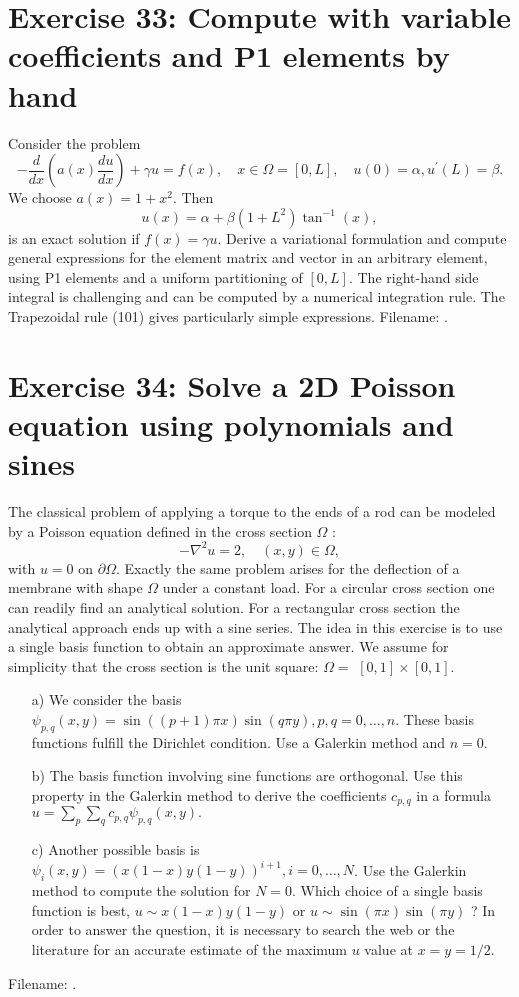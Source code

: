 \documentclass[../main.tex]{subfiles}
\begin{document}
	\section*{Exercise 33: Compute with variable coefficients and P1 elements by hand}
		\noindent Consider the problem
		\begin{equation}
			\label{311}
			-\frac{d}{d x}\left(a(x) \frac{d u}{d x}\right)+\gamma u=f(x), \quad x \in \Omega=[0, L], \quad u(0)=\alpha, u^{\prime}(L)=\beta .
		\end{equation}
		We choose $a(x)=1+x^{2}$. Then
		\begin{equation}
			\label{312}
			u(x)=\alpha+\beta\left(1+L^{2}\right) \tan ^{-1}(x),
		\end{equation}
		is an exact solution if $f(x)=\gamma u$.\smallbreak
		Derive a variational formulation and compute general expressions for the element matrix and vector in an arbitrary element, using P1 elements and a uniform partitioning of $[0, L]$. The right-hand side integral is challenging and can be computed by a numerical integration rule. The Trapezoidal rule (101) gives particularly simple expressions. Filename: .\bigbreak
	\section*{Exercise 34: Solve a 2D Poisson equation using polynomials and sines}
		\noindent The classical problem of applying a torque to the ends of a rod can be modeled by a Poisson equation defined in the cross section $\Omega$ :
		$$
		-\nabla^{2} u=2, \quad(x, y) \in \Omega,
		$$
		with $u=0$ on $\partial \Omega$. Exactly the same problem arises for the deflection of a membrane with shape $\Omega$ under a constant load.\smallbreak
		For a circular cross section one can readily find an analytical solution. For a rectangular cross section the analytical approach ends up with a sine series. The idea in this exercise is to use a single basis function to obtain an approximate answer.\smallbreak
		We assume for simplicity that the cross section is the unit square: $\Omega=$ $[0,1] \times[0,1]$.
		\begin{enumerate}
			\item[a)] We consider the basis $\psi_{p, q}(x, y)=\sin ((p+1) \pi x) \sin (q \pi y), p, q=0, \ldots, n$. These basis functions fulfill the Dirichlet condition. Use a Galerkin method and $n=0$.
			\item[b)] The basis function involving sine functions are orthogonal. Use this property in the Galerkin method to derive the coefficients $c_{p, q}$ in a formula $u=\sum_{p} \sum_{q} c_{p, q} \psi_{p, q}(x, y) .$
			\item [c)] Another possible basis is $\psi_{i}(x, y)=(x(1-x) y(1-y))^{i+1}, i=0, \ldots, N$. Use the Galerkin method to compute the solution for $N=0$. Which choice of a single basis function is best, $u \sim x(1-x) y(1-y)$ or $u \sim \sin (\pi x) \sin (\pi y)$ ? In order to answer the question, it is necessary to search the web or the literature for an accurate estimate of the maximum $u$ value at $x=y=1 / 2$.
		\end{enumerate}
			Filename: .\bigbreak
\end{document}
